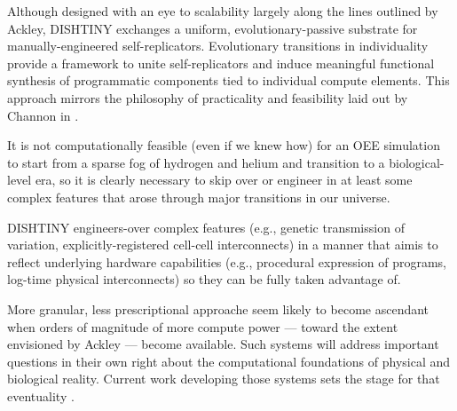 Although designed with an eye to scalability largely along the lines outlined by Ackley, DISHTINY exchanges a uniform, evolutionary-passive substrate for manually-engineered self-replicators.
Evolutionary transitions in individuality provide a framework to unite self-replicators and induce meaningful functional synthesis of programmatic components tied to individual compute elements.
This approach mirrors the philosophy of practicality and feasibility laid out by Channon in \citep{channon2019maximum}.

\begin{displayquote}
It is not computationally feasible (even if we knew how) for an OEE simulation to start from a sparse fog of hydrogen and helium and transition to a biological-level era, so it is clearly necessary to skip over or engineer in at least some complex features that arose through major transitions in our universe.
\end{displayquote}

DISHTINY engineers-over complex features (e.g., genetic transmission of variation, explicitly-registered cell-cell interconnects) in a manner that aimis to reflect underlying hardware capabilities (e.g., procedural expression of programs, log-time physical interconnects) so they can be fully taken advantage of.

More granular, less prescriptional approache seem likely to become ascendant when orders of magnitude of more compute power --- toward the extent envisioned by Ackley --- become available.
Such systems will address important questions in their own right about the computational foundations of physical and biological reality.
Current work developing those systems sets the stage for that eventuality \citep{ackley2018alife}.
